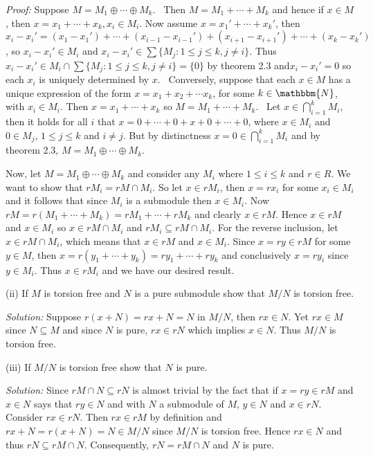 \documentclass{letter}
\newcommand{\tmem}[1]{{\em #1\/}}
\begin{document}
{\tmem{Proof:}} Suppose $M = M_1 \oplus \cdots \oplus M_k .$ \ Then $M = M_1
+ \cdots + M_k$ and hence if $x \in M$, then $x = x_1 + \cdots + x_k, x_i \in
M_i$. Now assume $x = x_1' + \cdots + x_k'$, then $x_i - x_i' = (x_1 - x_1') +
\cdots + (x_{i - 1} - x_{i - 1}') + (x_{i + 1} - x_{i + 1}') + \cdots + (x_k -
x_k')$, so $x_i - x_i' \in M_i$ and $x_i - x_i' \in \sum \{M_j : 1 \leq j \leq
k, j \neq i\}$. Thus $x_i - x_i' \in M_i \cap \sum \{M_j : 1 \leq j \leq k, j
\neq i\}=\{0\}$ by theorem 2.3 and$x_i - x_i' = 0$ so each $x_i$ is uniquely
determined by $x$. \ Conversely, suppose that each $x \in M$ has a unique
expression of the form $x = x_1 + x_2 + \cdots x_k$, for some $k \in
\mathbbm{N}$, with $x_i \in M_i$. Then $x = x_1 + \cdots + x_k$ so $M = M_1 +
\cdots + M_k$. \ Let $x \in \bigcap_{i = 1}^k M_i$, then it holds for all $i$
that $x = 0 + \cdots + 0 + x + 0 + \cdots + 0$, where $x \in M_i$ and $0 \in
M_j$, $1 \leq j \leq k$ and $i \neq j$. But by distinctness $x = 0 \in
\bigcap_{i = 1}^k M_i$ and by theorem 2.3, $M = M_1 \oplus \cdots \oplus M_k$.
\ \ \

Now, let $M = M_1 \oplus \cdots \oplus M_k$ and consider any $M_i$ where $1
\leq i \leq k$ and $r \in R$. We want to show that $r M_i = r M \cap M_i$. So
let $x \in r M_i$, then $x = r x_i$ for some $x_i \in M_i$ and it follows that
since $M_i$ is a submodule then $x \in M_i$. Now $r M = r (M_1 + \cdots + M_k)
= r M_1 + \cdots + r M_k$ and clearly $x \in r M$. Hence $x \in r M$ and $x
\in M_i$ so $x \in r M \cap M_i$ and $r M_i \subseteq r M \cap M_i$. For the
reverse inclusion, let $x \in r M \cap M_i$, which means that $x \in r M$ and
$x \in M_i$. Since $x = r y \in r M$ for some $y \in M$, then $x = r (y_1 +
\cdots + y_k) = r y_1 + \cdots + r y_k$ and conclusively $x = r y_i$ since $y
\in M_i$. Thus $x \in r M_i$ and we have our desired result.

(ii) If $M$ is torsion free and $N$ is a pure submodule show that $M / N$ is
torsion free.

{\tmem{Solution:}} Suppose $r (x + N) = r x + N = N$ in $M / N$, then $r x \in
N$. Yet $r x \in M$ since $N \subseteq M$ and since $N$ is pure, $r x \in r N$
which implies $x \in N$. Thus $M / N$ is torsion free.

(iii) If $M / N$ is torsion free show that $N$ is pure.

{\tmem{Solution:}} Since $r M \cap N \subseteq r N$ is almost trivial by the
fact that if $x = r y \in r M$ and $x \in N$ says that $r y \in N$ and with
$N$ a submodule of $M$, $y \in N$ and $x \in r N$. Consider $r x \in r N$.
Then $r x \in r M$ by definition and $r x + N = r (x + N) = N \in M / N$ since
$M / N$ is torsion free. Hence $r x \in N$ and thus $r N \subseteq r M \cap
N$. Consequently, $r N = r M \cap N$ and $N$ is pure.
\end{document}
